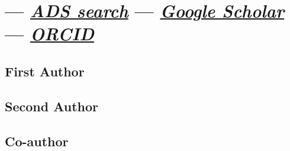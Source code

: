 \documentclass[10pt, letterpaper]{cv}
\begin{document}
\thispagestyle{empty}\sloppy\sloppypar



\ifcvpublistonly\else

\fi

\section*{\cvpublicationsectiontitle --- \href{\adsurl}{{\it ADS search}} --- \href{\scholarurl}{{\it Google Scholar}} --- \href{\orcidurl}{{\it ORCID}}}
\vspace{-1.5em}

\ifcvnopublist\else
\subsection*{First Author}
\begin{itemize}
    
\end{itemize}

\subsection*{Second Author}
\begin{itemize}
    
\end{itemize}

\subsection*{Co-author}
\begin{itemize}
    
\end{itemize}
\fi
\end{document}
